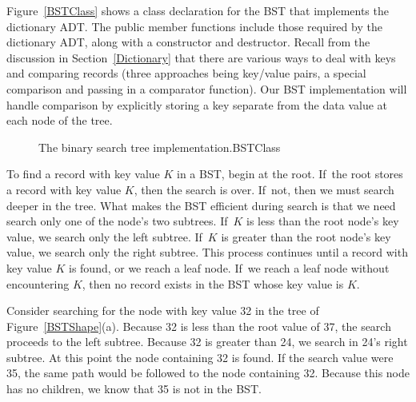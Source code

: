 Figure~\ref{BSTClass} shows a class declaration for the BST
that implements the dictionary
ADT.
The public member functions include those required by the dictionary
ADT, along with a constructor and destructor.
Recall from the discussion in Section~\ref{Dictionary} that there are
various ways to deal with keys and comparing records (three approaches
being key/value pairs, a special comparison
and passing in a comparator function).
Our BST implementation will handle comparison by explicitly storing
a key separate from the data value at each node of the tree.

\begin{figure}

{The binary search tree implementation.}{BSTClass}
\end{figure}


To find a record with key value \(K\) in a BST, begin at the root.
If~the root stores a record with key value \(K\),
then the search is over.
If~not, then we must search deeper in the tree.
What makes the BST efficient during search is that we need search only
one of the node's two subtrees.
If~\(K\) is less than the root node's key value,
we search only the left subtree.
If~\(K\) is greater than the root node's key value, we search only the
right subtree.
This process continues until a record with key value \(K\) is found,
or we reach a leaf node.
If~we reach a leaf node without encountering \(K\), then
no record exists in the BST whose key value is \(K\).

\begin{example}
Consider searching for the node with key value 32 in the tree of
Figure~\ref{BSTShape}(a).
Because 32 is less than the root value of 37, the search
proceeds to the left subtree.
Because 32 is greater than 24, we search in 24's right subtree.
At this point the node containing 32 is found.
If the search value were 35, the same path would be followed to the
node containing 32.
Because this node has no children, we know that 35 is not
in the BST.
\end{example}

